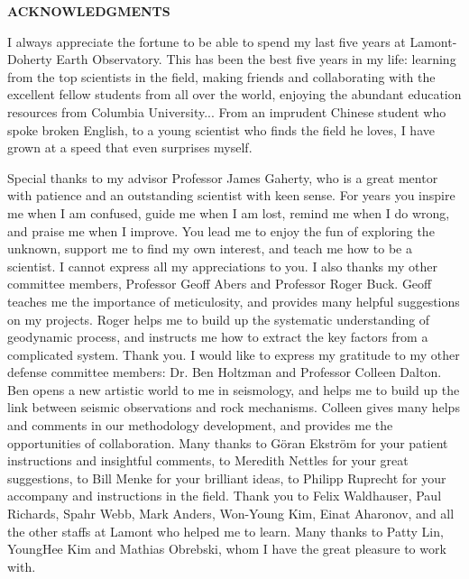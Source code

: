 \begin{center}
{\bf ACKNOWLEDGMENTS }
\end{center}
{\fontsize{11}{14}
\selectfont

I always appreciate the fortune to be able to spend my last five years at Lamont-Doherty Earth Observatory. This has been the best five years in my life: learning from the top scientists in the field, making friends and collaborating with the excellent fellow students from all over the world, enjoying the abundant education resources from Columbia University... From an imprudent Chinese student who spoke broken English, to a young scientist who finds the field he loves, I have grown at a speed that even surprises myself. 

Special thanks to my advisor Professor James Gaherty, who is a great mentor with patience and an outstanding scientist with keen sense. For years you inspire me when I am confused, guide me when I am lost, remind me when I do wrong, and praise me when I improve. You lead me to enjoy the fun of exploring the unknown, support me to find my own interest, and teach me how to be a scientist. I cannot express all my appreciations to you. I also thanks my other committee members, Professor Geoff Abers and Professor Roger Buck. Geoff teaches me the importance of meticulosity, and provides many helpful suggestions on my projects. Roger helps me to build up the systematic understanding of geodynamic process, and instructs me how to extract the key factors from a complicated system. Thank you. I would like to express my gratitude to my other defense committee members: Dr. Ben Holtzman and Professor Colleen Dalton. Ben opens a new artistic world to me in seismology, and helps me to build up the link between seismic observations and rock mechanisms. Colleen gives many helps and comments in our methodology development, and provides me the opportunities of collaboration.  Many thanks to G\"oran Ekstr\"om for your patient instructions and insightful comments, to Meredith Nettles for your great suggestions,  to Bill Menke for your brilliant ideas, to Philipp Ruprecht for your accompany and instructions in the field. Thank you to Felix Waldhauser, Paul Richards, Spahr Webb, Mark Anders, Won-Young Kim, Einat Aharonov, and all the other staffs at Lamont who helped me to learn. Many thanks to Patty Lin, YoungHee Kim and Mathias Obrebski, whom I have the great pleasure to work with. 

}
